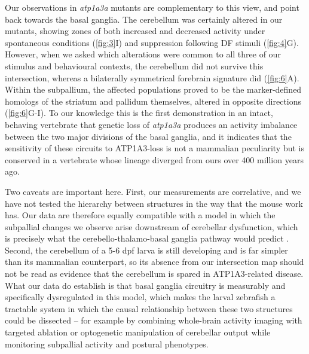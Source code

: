 \documentclass[9.5pt,lineno]{RandlettLab_elife}
\begin{document}
Our observations in \emph{atp1a3a} mutants are complementary to this view, and point back towards the basal ganglia.
The cerebellum was certainly altered in our mutants, showing zones of both increased and decreased activity under spontaneous conditions (\autoref{fig:3}I) and suppression following DF stimuli (\autoref{fig:4}G).
However, when we asked which alterations were common to all three of our stimulus and behavioural contexts, the cerebellum did not survive this intersection, whereas a bilaterally symmetrical forebrain signature did (\autoref{fig:6}A).
Within the subpallium, the affected populations proved to be the marker-defined homologs of the striatum and pallidum themselves, altered in opposite directions (\autoref{fig:6}G-I).
To our knowledge this is the first demonstration in an intact, behaving vertebrate that genetic loss of \emph{atp1a3a} produces an activity imbalance between the two major divisions of the basal ganglia, and it indicates that the sensitivity of these circuits to ATP1A3-loss is not a mammalian peculiarity but is conserved in a vertebrate whose lineage diverged from ours over 400 million years ago.

Two caveats are important here.
First, our measurements are correlative, and we have not tested the hierarchy between structures in the way that the mouse work has.
Our data are therefore equally compatible with a model in which the subpallial changes we observe arise downstream of cerebellar dysfunction, which is precisely what the cerebello-thalamo-basal ganglia pathway would predict \citep{Calderon2011-no, Tewari2017}.
Second, the cerebellum of a 5-6 dpf larva is still developing and is far simpler than its mammalian counterpart, so its absence from our intersection map should not be read as evidence that the cerebellum is spared in ATP1A3-related disease.
What our data do establish is that basal ganglia circuitry is measurably and specifically dysregulated in this model, which makes the larval zebrafish a tractable system in which the causal relationship between these two structures could be dissected -- for example by combining whole-brain activity imaging with targeted ablation or optogenetic manipulation of cerebellar output while monitoring subpallial activity and postural phenotypes.
\end{document}
